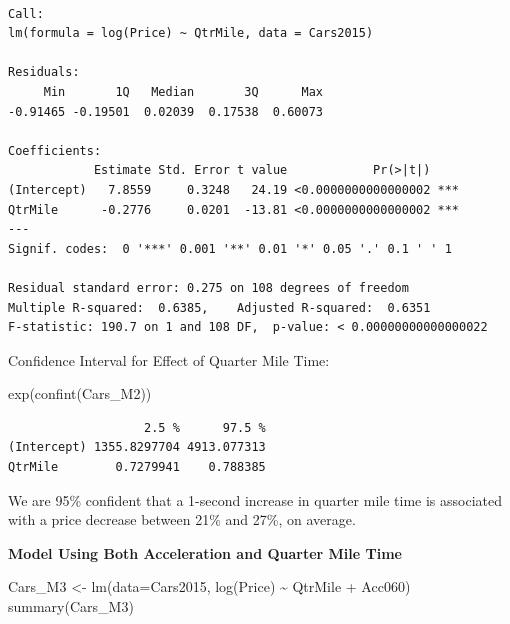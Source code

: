 \documentclass[
  letterpaper,
  DIV=11,
  numbers=noendperiod]{scrreprt}
\newenvironment{Shaded}{\begin{snugshade}}{\end{snugshade}}
\newcommand{\AttributeTok}[1]{\textcolor[rgb]{0.40,0.45,0.13}{#1}}
\newcommand{\FunctionTok}[1]{\textcolor[rgb]{0.28,0.35,0.67}{#1}}
\newcommand{\NormalTok}[1]{\textcolor[rgb]{0.00,0.23,0.31}{#1}}
\newcommand{\OtherTok}[1]{\textcolor[rgb]{0.00,0.23,0.31}{#1}}
\newcommand{\SpecialCharTok}[1]{\textcolor[rgb]{0.37,0.37,0.37}{#1}}
\begin{document}
\begin{verbatim}

Call:
lm(formula = log(Price) ~ QtrMile, data = Cars2015)

Residuals:
     Min       1Q   Median       3Q      Max 
-0.91465 -0.19501  0.02039  0.17538  0.60073 

Coefficients:
            Estimate Std. Error t value            Pr(>|t|)    
(Intercept)   7.8559     0.3248   24.19 <0.0000000000000002 ***
QtrMile      -0.2776     0.0201  -13.81 <0.0000000000000002 ***
---
Signif. codes:  0 '***' 0.001 '**' 0.01 '*' 0.05 '.' 0.1 ' ' 1

Residual standard error: 0.275 on 108 degrees of freedom
Multiple R-squared:  0.6385,    Adjusted R-squared:  0.6351 
F-statistic: 190.7 on 1 and 108 DF,  p-value: < 0.00000000000000022
\end{verbatim}

Confidence Interval for Effect of Quarter Mile Time:

\begin{Shaded}
\begin{Highlighting}[]
\FunctionTok{exp}\NormalTok{(}\FunctionTok{confint}\NormalTok{(Cars\_M2))}
\end{Highlighting}
\end{Shaded}

\begin{verbatim}
                   2.5 %      97.5 %
(Intercept) 1355.8297704 4913.077313
QtrMile        0.7279941    0.788385
\end{verbatim}

We are 95\% confident that a 1-second increase in quarter mile time is
associated with a price decrease between 21\% and 27\%, on average.

\textbf{Model Using Both Acceleration and Quarter Mile Time}

\begin{Shaded}
\begin{Highlighting}[]
\NormalTok{Cars\_M3 }\OtherTok{\textless{}{-}} \FunctionTok{lm}\NormalTok{(}\AttributeTok{data=}\NormalTok{Cars2015, }\FunctionTok{log}\NormalTok{(Price) }\SpecialCharTok{\textasciitilde{}}\NormalTok{ QtrMile }\SpecialCharTok{+}\NormalTok{ Acc060)}
\FunctionTok{summary}\NormalTok{(Cars\_M3)}
\end{Highlighting}
\end{Shaded}
\end{document}
